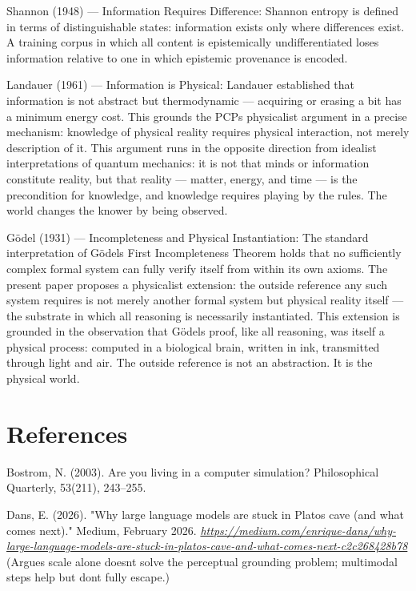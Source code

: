 \documentclass[12pt]{article}
\begin{document}
Shannon (1948) --- Information Requires Difference: Shannon entropy is
defined in terms of distinguishable states: information exists only
where differences exist. A training corpus in which all content is
epistemically undifferentiated loses information relative to one in
which epistemic provenance is encoded.

Landauer (1961) --- Information is Physical: Landauer established that
information is not abstract but thermodynamic --- acquiring or erasing a
bit has a minimum energy cost. This grounds the PCP\textquotesingle s
physicalist argument in a precise mechanism: knowledge of physical
reality requires physical interaction, not merely description of it.
This argument runs in the opposite direction from idealist
interpretations of quantum mechanics: it is not that minds or
information constitute reality, but that reality --- matter, energy, and
time --- is the precondition for knowledge, and knowledge requires
playing by the rules. The world changes the knower by being observed.

Gödel (1931) --- Incompleteness and Physical Instantiation: The standard
interpretation of Gödel\textquotesingle s First Incompleteness Theorem
holds that no sufficiently complex formal system can fully verify itself
from within its own axioms. The present paper proposes a physicalist
extension: the outside reference any such system requires is not merely
another formal system but physical reality itself --- the substrate in
which all reasoning is necessarily instantiated. This extension is
grounded in the observation that Gödel\textquotesingle s proof, like all
reasoning, was itself a physical process: computed in a biological
brain, written in ink, transmitted through light and air. The outside
reference is not an abstraction. It is the physical world.

\section*{References}
\begingroup
\setlength{\parindent}{0pt}
\setlength{\parskip}{4pt}
\setlength{\hangindent}{1.5em}
\raggedright

Bostrom, N. (2003). Are you living in a computer simulation?
Philosophical Quarterly, 53(211), 243--255.

Dans, E. (2026). "Why large language models are stuck in
Plato\textquotesingle s cave (and what comes next)." Medium, February
2026.
\href{https://medium.com/enrique-dans/why-large-language-models-are-stuck-in-platos-cave-and-what-comes-next-c2c268428b78}{\textit{https://medium.com/enrique-dans/why-large-language-models-are-stuck-in-platos-cave-and-what-comes-next-c2c268428b78\\
}}(Argues scale alone doesn\textquotesingle t solve the perceptual
grounding problem; multimodal steps help but don\textquotesingle t fully
escape.)
\end{document}
